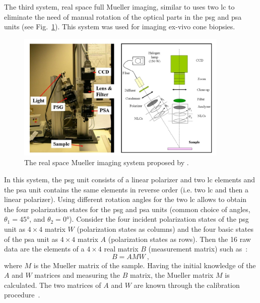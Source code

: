 The third system, real space full Mueller imaging, similar to \cite{de2004general} uses two \ac{lc} to eliminate the need of manual rotation of the optical parts in the \ac{psg} and \ac{psa} units (see Fig.~\ref{fig:RSMueller}).
This system was used for imaging ex-vivo cone biopsies.
	\begin{figure}[h]
	\centering 
	\includegraphics[width = 0.9\textwidth]{Chapter4/Figures/RealMuellerImagingSystem.png}	
	\caption[Real spape Mueller imaging proposed by \cite{antonelli2011biomedical}]{ The real space Mueller imaging system proposed by \cite{antonelli2011biomedical}. }
	\label{fig:RSMueller}
	\end{figure}

\noindent In this system, the \ac{psg} unit consists of a linear polarizer and two \ac{lc} elements and the \ac{psa} unit contains the same elements in reverse order (i.e. two \ac{lc} and then a linear polarizer).
Using different rotation angles for the two \ac{lc} allows to obtain the four polarization states for the \ac{psg} and \ac{psa} units (common choice of angles, $\theta_{1} = \ang{45}$, and $\theta_{2} = \ang{0}$).
Consider the four incident polarization states of the \ac{psg} unit as $4 \times 4$ matrix $W$ (polarization states as columns) and the four basic states of the \ac{psa} unit as $4 \times 4$ matrix $A$ (polarization states as rows).
Then the 16 raw data are the elements of a $4 \times 4$ real matrix $B$ (measurement matrix) such as~\cite{de2004general, antonelli2011biomedical}:
	\begin{equation}
	\label{eq:LCMuellerEq}
	B = AMW~,
	\end{equation}
\noindent where $M$ is the Mueller matrix of the sample.
Having the initial knowledge of the $A$ and $W$ matrices and measuring the $B$ matrix, the Mueller matrix $M$ is calculated.
The two matrices of $A$ and $W$ are known through the calibration procedure~\cite{compain1999general}.

